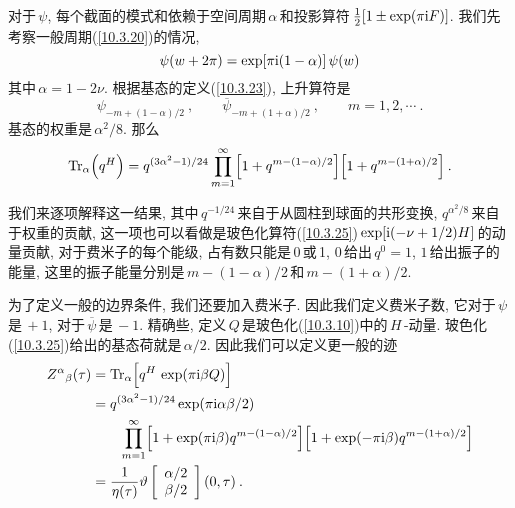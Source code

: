 对于$\,\psi$, 每个截面的模式和依赖于空间周期$\,\alpha\,$和投影算符$\,\frac{1}{2}[1\pm\exp(\pi\mathrm{i} F)]$. 我们先考察一般周期(\ref{10.3.20})的情况,
\begin{equation}
    \psi(w+2\pi) =\exp[\pi\mathrm{i}(1-\alpha)]\,\psi(w) \label{10.7.4}
\end{equation}
其中$\,\alpha=1-2\nu$. 根据基态的定义(\ref{10.3.23}), 上升算符是
\begin{equation}
    \psi_{-m+(1-\alpha)/2}\:,\qquad \overline{\psi}_{-m+(1+\alpha)/2}\:,   \qquad m=1,2,\cdots \:.\label{10.7.5}
\end{equation}
基态的权重是$\,\alpha^{2}/8$. 那么
\begin{equation}
    \operatorname{Tr}_{\alpha}\Bigl(q^{H}\Bigr) = q^{(3\alpha^{2}-1)/24}\prod_{m=1}^{\infty}\Bigl[1+q^{m-(1-\alpha)/2}\Bigr]
    \Bigl[1+q^{m-(1+\alpha)/2}\Bigr]\:.\label{10.7.6}
\end{equation}
\begin{tcolorbox}
\noindent 我们来逐项解释这一结果, 其中$\,q^{-1/24}\,$来自于从圆柱到球面的共形变换, $q^{\alpha^{2}/8}\,$来自于权重的贡献, 这一项也可以看做是玻色化算符(\ref{10.3.25})$\,\exp[\mathrm{i}(-\nu+1/2)H]\,$的动量贡献, 对于费米子的每个能级, 占有数只能是\,0\,或\,1, 0\,给出$\,q^{0}=1$, $1\,$给出振子的能量, 这里的振子能量分别是$\,m-(1-\alpha)/2\,$和$\,m-(1+\alpha)/2$.
\end{tcolorbox}
\noindent 为了定义一般的边界条件, 我们还要加入费米子. 因此我们定义费米子数, 它对于$\,\psi\,$是$\,+1$, 对于$\,\overline{\psi}\,$是$\,-1$. 精确些, 定义$\,Q\,$是玻色化(\ref{10.3.10})中的$\,H\,$-动量. 玻色化(\ref{10.3.25})给出的基态荷就是$\,\alpha/2$. 因此我们可以定义更一般的迹
\begin{subequations}
    \begin{align}
        Z^{\alpha}{}_{\beta}(\tau) &= \operatorname{Tr}_{\alpha}\Bigl[q^{H}\,\exp(\pi\mi \beta Q)\Bigr]\label{10.7.7a} \\
        &= q^{(3\alpha^{2}-1)/24}\exp(\pi\mi\alpha\beta/2) \nonumber \\
        &\qquad \prod_{m=1}^{\infty}\Bigl[1+\exp(\pi\mi\beta)q^{m-(1-\alpha)/2}\Bigr]\Bigl[1+\exp(-\pi\mi\beta)q^{m-(1+\alpha)/2}\Bigr]\label{10.7.7b} \\
        & =\frac{1}{\eta(\tau)}\vartheta \left[
            \begin{array}{c}
            \alpha/2  \\ \beta/2
            \end{array}%
            \right] (0,\tau) \:.  \label{10.7.7c}
    \end{align} \label{10.7.7}
\end{subequations}


